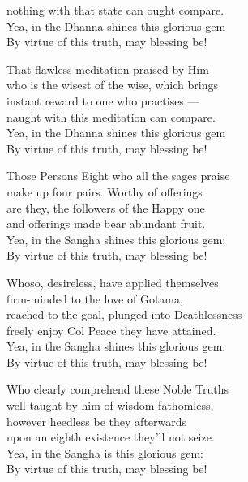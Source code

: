 \begin{MyDescription}{}
nothing with that state can ought compare.\\
Yea, in the Dhanna shines this glorious gem\\
By virtue of this truth, may blessing be!
\end{MyDescription}

\begin{MyDescription}{}
That ﬂawless meditation praised by Him\\
who is the wisest of the wise, which brings\\
instant reward to one who practises —\\
naught with this meditation can compare.\\
Yea, in the Dhanna shines this glorious gem\\
By virtue of this truth, may blessing be!
\end{MyDescription}

\begin{MyDescription}{}
Those Persons Eight who all the sages praise\\
make up four pairs. Worthy of offerings\\
are they, the followers of the Happy one\\
and offerings made bear abundant fruit.\\
Yea, in the Sangha shines this glorious gem:\\
By virtue of this truth, may blessing be!
\end{MyDescription}

\begin{MyDescription}{}
Whoso, desireless, have applied themselves\\
ﬁrm-minded to the love of Gotama,\\
reached to the goal, plunged into Deathlessness\\
freely enjoy Col Peace they have attained.\\
Yea, in the Sangha shines this glorious gem:\\
By virtue of this truth, may blessing be!
\end{MyDescription}
 
\begin{MyDescription}{}
Who clearly comprehend these Noble Truths\\
well-taught by him of wisdom fathomless,\\
however heedless be they afterwards\\
upon an eighth existence they'll not seize.\\
Yea, in the Sangha is this glorious gem:\\
By virtue of this truth, may blessing be!
\end{MyDescription}

